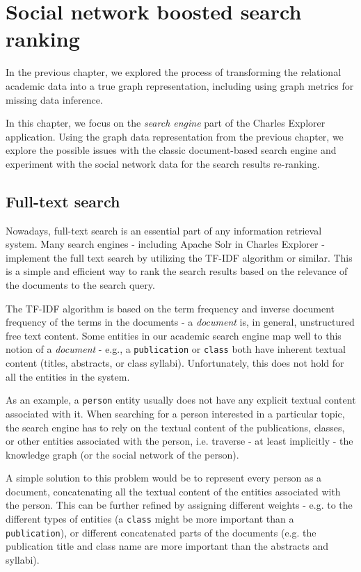 \chapter{Social network boosted search ranking}

In the previous chapter, we explored the process of transforming the relational academic data 
into a true graph representation, including using graph metrics for missing data inference.

In this chapter, we focus on the \textit{search engine} part of the Charles Explorer application.
Using the graph data representation from the previous chapter, we explore the possible issues with the classic 
document-based search engine and experiment with the social network data for the search results re-ranking.

\section{Full-text search}

Nowadays, full-text search is an essential part of any information retrieval system. 
Many search engines - including Apache Solr in Charles Explorer - implement the full text search by utilizing the TF-IDF algorithm or similar.
This is a simple and efficient way to rank the search results based on the relevance of the documents to the search query.

The TF-IDF algorithm is based on the term frequency and inverse document frequency of the terms in the documents - a \textit{document} is, in general, unstructured free text content.
Some entities in our academic search engine map well to this notion of a \textit{document} - e.g., a \texttt{publication} or \texttt{class} both have inherent textual content (titles, abstracts, or class syllabi).
Unfortunately, this does not hold for all the entities in the system.

As an example, a \texttt{person} entity usually does not have any explicit textual content associated with it. 
When searching for a person interested in a particular topic, the search engine has to rely on the textual content of the publications, classes, 
or other entities associated with the person, i.e. traverse - at least implicitly - the knowledge graph (or the social network of the person).

A simple solution to this problem would be to represent every person as a document, concatenating all the textual content of the entities associated with the person.
This can be further refined by assigning different weights - e.g. to the different types of entities (a \texttt{class} might be more important than a \texttt{publication}), 
or different concatenated parts of the documents (e.g. the publication title and class name are more important than the abstracts and syllabi).

